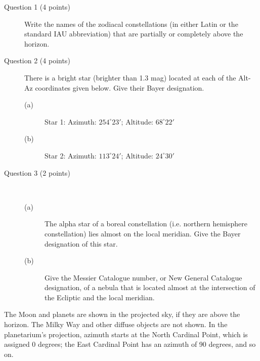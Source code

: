 \begin{description}
\item[Question 1 (4 points)] Write the names of the zodiacal constellations
  (in either Latin or the standard IAU abbreviation) that are partially or
  completely above the horizon.
\item[Question 2 (4 points)] There is a bright star (brighter than 1.3 mag)
  located at each of the Alt-Az coordinates given below. Give their Bayer
  designation.
  \begin{description}
  \item[(a)] Star 1: Azimuth: $254^\circ 23'$; Altitude: $68^\circ 22'$
  \item[(b)] Star 2: Azimuth: $113^\circ 24'$; Altitude: $24^\circ 30'$
  \end{description}
\item[Question 3 (2 points)]~
  \begin{description}
  \item[(a)] The alpha star of a boreal constellation (i.e. northern
    hemisphere constellation) lies almost on the local meridian. Give the
    Bayer designation of this star.
  \item[(b)] Give the Messier Catalogue number, or New General Catalogue
    designation, of a nebula that is located almost at the intersection of
    the Ecliptic and the local meridian.
  \end{description}
\end{description}

The Moon and planets are shown in the projected sky, if they are above the
horizon. The Milky Way and other diffuse objects are not shown. In the
planetarium's projection, azimuth starts at the North Cardinal Point, which
is assigned 0 degrees; the East Cardinal Point has an azimuth of 90 degrees,
and so on.

